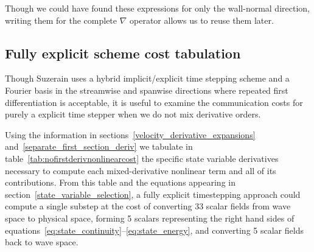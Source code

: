 \documentclass[letterpaper,11pt,nointlimits,reqno]{amsart}
\begin{document}
Though we could have found these expressions for only the wall-normal
direction, writing them for the complete $\nabla$ operator allows us to reuse
them later.

\subsection{Fully explicit scheme cost tabulation}

Though Suzerain uses a hybrid implicit/explicit time stepping scheme and a
Fourier basis in the streamwise and spanwise directions where repeated first
differentiation is acceptable, it is useful to examine the communication costs
for purely a explicit time stepper when we do not mix derivative orders.

Using the information in sections~\ref{velocity_derivative_expansions}
and~\ref{separate_first_section_deriv} we tabulate in
table~\ref{tab:nofirstderivnonlinearcost} the specific state variable
derivatives necessary to compute each mixed-derivative nonlinear term and all
of its contributions.  From this table and the equations appearing in
section~\ref{state_variable_selection}, a fully explicit timestepping approach
could compute a single substep at the cost of converting 33 scalar fields from
wave space to physical space, forming 5 scalars representing the right hand
sides of equations~\eqref{eq:state_continuity}--\eqref{eq:state_energy}, and
converting 5 scalar fields back to wave space.
\end{document}
